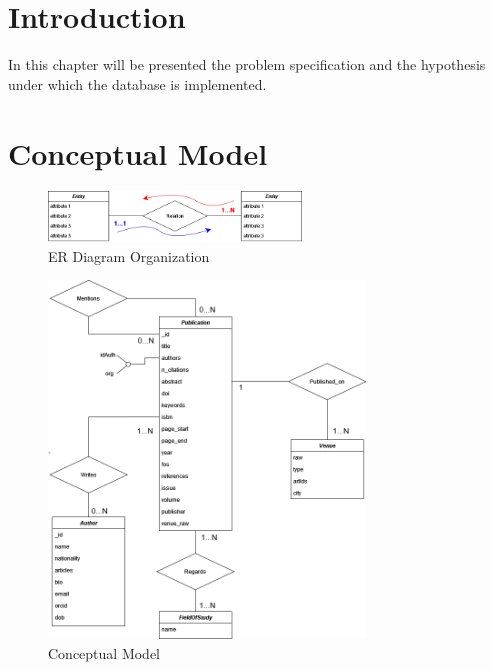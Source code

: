 \documentclass{Configuration_Files/PoliMi3i_thesis}
\begin{document}
\mainmatter %

\chapter{Introduction}
\label{ch:introduction}
In this chapter will be presented the problem specification and the hypothesis under which the database is implemented.


\chapter{Conceptual Model}
\label{ch:conc_model}
\begin{figure}[H]
\centering
\includegraphics[width=0.6\textwidth]{legendaER.png}
\caption{ER Diagram Organization}
\label{fig:erleg}
\end{figure}
\begin{figure}[H]
\centering
\includegraphics[width=0.75\textwidth]{ERSpark.png}
\caption{Conceptual Model}
\label{fig:er}
\end{figure}
\newpage
\end{document}
